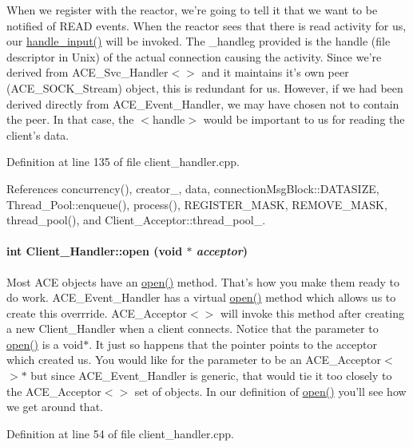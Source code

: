 When we register with the reactor, we're going to tell it that we want to be notified of READ events. When the reactor sees that there is read activity for us, our \hyperlink{classClient__Handler_Client__Handlera5}{handle\_\-input()} will be invoked. The \_\-handleg provided is the handle (file descriptor in Unix) of the actual connection causing the activity. Since we're derived from ACE\_\-Svc\_\-Handler$<$$>$ and it maintains it's own peer (ACE\_\-SOCK\_\-Stream) object, this is redundant for us. However, if we had been derived directly from ACE\_\-Event\_\-Handler, we may have chosen not to contain the peer. In that case, the $<$handle$>$ would be important to us for reading the client's data. 

Definition at line 135 of file client\_\-handler.cpp.

References concurrency(), creator\_\-, data, connection\-Msg\-Block::DATASIZE, Thread\_\-Pool::enqueue(), process(), REGISTER\_\-MASK, REMOVE\_\-MASK, thread\_\-pool(), and Client\_\-Acceptor::thread\_\-pool\_\-.\hypertarget{classClient__Handler_Client__Handlera2}{
\paragraph[open]{\setlength{\rightskip}{0pt plus 5cm}int Client\_\-Handler::open (void $\ast$ {\em acceptor})}\hfill}
\label{classClient__Handler_Client__Handlera2}


Most ACE objects have an \hyperlink{classClient__Handler_Client__Handlera2}{open()} method. That's how you make them ready to do work. ACE\_\-Event\_\-Handler has a virtual \hyperlink{classClient__Handler_Client__Handlera2}{open()} method which allows us to create this overrride. ACE\_\-Acceptor$<$$>$ will invoke this method after creating a new Client\_\-Handler when a client connects. Notice that the parameter to \hyperlink{classClient__Handler_Client__Handlera2}{open()} is a void$\ast$. It just so happens that the pointer points to the acceptor which created us. You would like for the parameter to be an ACE\_\-Acceptor$<$$>$$\ast$ but since ACE\_\-Event\_\-Handler is generic, that would tie it too closely to the ACE\_\-Acceptor$<$$>$ set of objects. In our definition of \hyperlink{classClient__Handler_Client__Handlera2}{open()} you'll see how we get around that. 

Definition at line 54 of file client\_\-handler.cpp.


